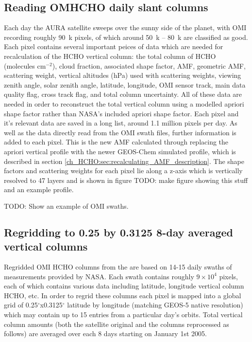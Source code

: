   \subsection{Reading OMHCHO daily slant columns}
    Each day the AURA satellite sweeps over the sunny side of the planet, with OMI recording roughly 90~k pixels, of which around 50~k -- 80~k are classified as good.
    Each pixel contains several important peices of data which are needed for recalculation of the HCHO vertical column: the total column of HCHO (molecules cm$^{-2}$), cloud fraction, associated shape factor, AMF, geometric AMF, scattering weight, vertical altitudes (hPa) used with scattering weights, viewing zenith angle, solar zenith angle, latitude, longitude, OMI sensor track, main data quality flag, cross track flag, and total column uncertainty.
    All of these data are needed in order to reconstruct the total vertical column using a modelled apriori shape factor rather than NASA's included apriori shape factor.
    Each pixel and it's relevant data are saved in a long list, around 1.1 million pixels per day.
    As well as the data directly read from the OMI swath files, further information is added to each pixel.
    This is the new AMF calculated through replacing the apriori vertical profile with the newer GEOS-Chem simulated profile, which is described in section \ref{ch_HCHO:sec:recalculating_AMF_description}.
    The shape factors and scattering weights for each pixel lie along a z-axis which is vertically resolved to 47 layers and is shown in figure TODO: make figure showing this stuff and an example profile.
    
    TODO: Show an example of OMI swaths.
    
  \subsection{Regridding to 0.25 by 0.3125 8-day averaged vertical columns}
    
    Regridded OMI HCHO columns from the are based on 14-15 daily swaths of measurements provided by NASA. 
    Each swath contains roughly $9 \times 10^4$ pixels, each of which contains various data including latitude, longitude vertical column HCHO, etc.
    In order to regrid these columns each pixel is mapped into a global grid of 0.25$^{\circ}$x0.3125$^{\circ}$ latitude by longitude (matching GEOS-5 native resolution) which may contain up to 15 entries from a particular day's orbits.
    Total vertical column amounts (both the satellite original and the columns reprocessed as follows) are averaged over each 8 days starting on January 1st 2005.
    
